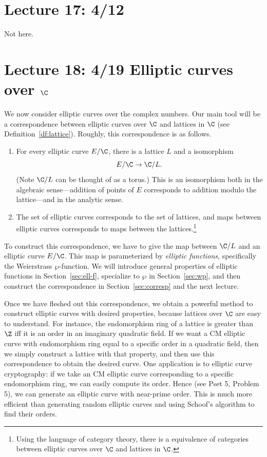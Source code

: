 \section{Lecture 17: 4/12}
Not here.
\section{Lecture 18: 4/19 Elliptic curves over $\C$}
We now consider elliptic curves over the complex numbers. Our main tool will be a correspondence between elliptic curves over $\C$ and lattices in $\C$ (see Definition~\ref{df:lattice}). Roughly, this correspondence is as follows.
\begin{enumerate}
\item For every elliptic curve $E/\C$, there is a lattice $L$ and a isomorphism
\[
E/\C\to \C/L.
\]
(Note $\C/L$ can be thought of as a torus.)
This is an isomorphism both in the algebraic sense---addition of points of $E$ corresponds to addition modulo the lattice---and in the analytic sense.
\item The set of elliptic curves corresponds to the set of lattices, and maps between elliptic curves corresponds to maps between the lattices.\footnote{Using the language of category theory, there is a equivalence of categories between elliptic curves over $\C$ and lattices in $\C$.}
\end{enumerate}
To construct this correspondence, we have to give the map between $\C/L$ and an elliptic curve $E/\C$. This map is parameterized by {\it elliptic functions}, specifically the Weierstrass $\wp$-function. We will introduce general properties of elliptic functions in Section~\ref{sec:ell-f}, specialize to $\wp$ in Section~\ref{sec:wp}, and then construct the correspondence in Section~\ref{sec:corresp} and the next lecture.

Once we have fleshed out this correspondence, we obtain a powerful method to construct elliptic curves with desired properties, because lattices over $\C$ are easy to understand. For instance, the endomorphism ring of a lattice is greater than $\Z$ iff it is an order in an imaginary quadratic field. If we want a CM elliptic curve with endomorphism ring equal to a specific order in a quadratic field, then we simply construct a lattice with that property, and then use this correspondence to obtain the desired curve. 
One application is to elliptic curve cryptography: if we take an CM elliptic curve corresponding to a specific endomorphism ring, we can easily compute its order. Hence (see Pset 5, Problem 5), we can generate an elliptic curve with near-prime order. This is much more efficient than generating random elliptic curves and using Schoof's algorithm to find their orders.

